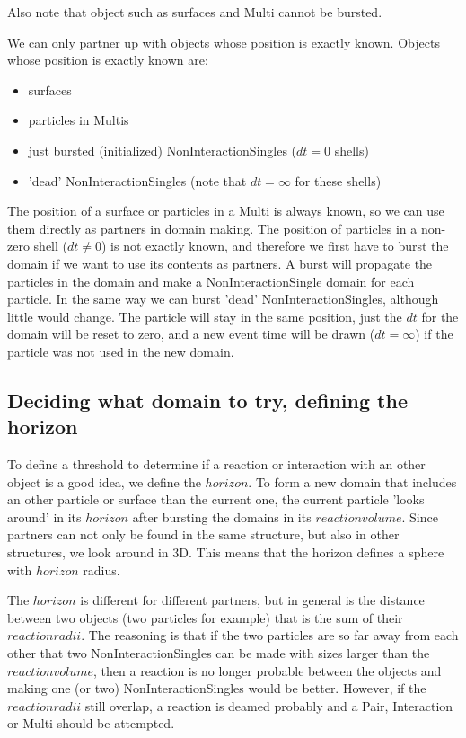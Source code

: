 \documentclass[a4paper,11pt]{article}
\begin{document}
Also note that object such as surfaces and Multi cannot be bursted.

We can only partner up with objects whose position is exactly known. Objects whose position is exactly known are:
\begin{itemize}
 \item surfaces
 \item particles in Multis
 \item just bursted (initialized) NonInteractionSingles ($dt=0$ shells)
 \item 'dead' NonInteractionSingles (note that $dt=\infty$ for these shells)
\end{itemize}
The position of a surface or particles in a Multi is always known, so we can use them directly as partners in domain making.
The position of particles in a non-zero shell ($dt \neq 0$) is not exactly known, and therefore we first have to burst the
domain if we want to use its contents as partners. A burst will propagate the particles in the domain and make a
NonInteractionSingle domain for each particle.
In the same way we can burst 'dead' NonInteractionSingles, although little would change. The particle will stay in the
same position, just the $dt$ for the domain will be reset to zero, and a new event time will be drawn ($dt=\infty$) if the
particle was not used in the new domain.


\subsection{Deciding what domain to try, defining the horizon}
To define a threshold to determine if a reaction or interaction with an other object is a good idea, we define the $horizon$.
To form a new domain that includes an other particle or surface than the current one, the current particle 'looks around' in
its $horizon$ after bursting the domains in its $reaction volume$. Since partners can
not only be found in the same structure, but also in other structures, we look around in 3D. This means that the horizon
defines a sphere with $horizon$ radius.

The $horizon$ is different for different partners, but in general
is the distance between two objects (two particles for example) that is the sum of their $reaction radii$. The
reasoning is
that if the two particles are so far away from each other that two NonInteractionSingles can be made with sizes larger than the
$reaction volume$, then a reaction is no longer probable between the objects and making one (or two) NonInteractionSingles
would be better. However, if the $reaction radii$ still overlap, a reaction is deamed probably and a Pair, Interaction or Multi
should be attempted.
\end{document}
